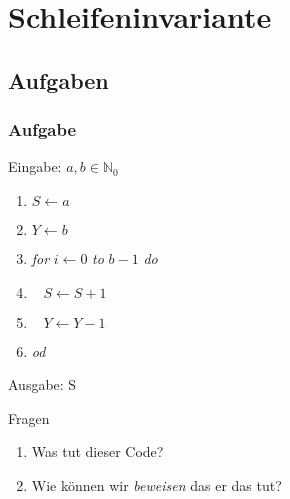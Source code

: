 \section{Schleifeninvariante}
\subsection{Aufgaben}
\begin{frame}
  \frametitle{Aufgabe}
  Eingabe: $a, b \in \mathbb{N}_0$
  \begin{enumerate}
    \item $S \leftarrow a$
    \item $Y \leftarrow b$
    \item \emph{for} $i \leftarrow 0$ \emph{to} $b-1$ \emph{do}
    \item $\;\;\;S \leftarrow S+1$
    \item $\;\;\;Y \leftarrow Y-1$
    \item \emph{od}
  \end{enumerate}
  Ausgabe: S
  \begin{exampleblock}{Fragen}
    \begin{enumerate}
      \item Was tut dieser Code?
      \item Wie können wir \emph{beweisen} das er das tut?
    \end{enumerate}
  \end{exampleblock}
\end{frame}
